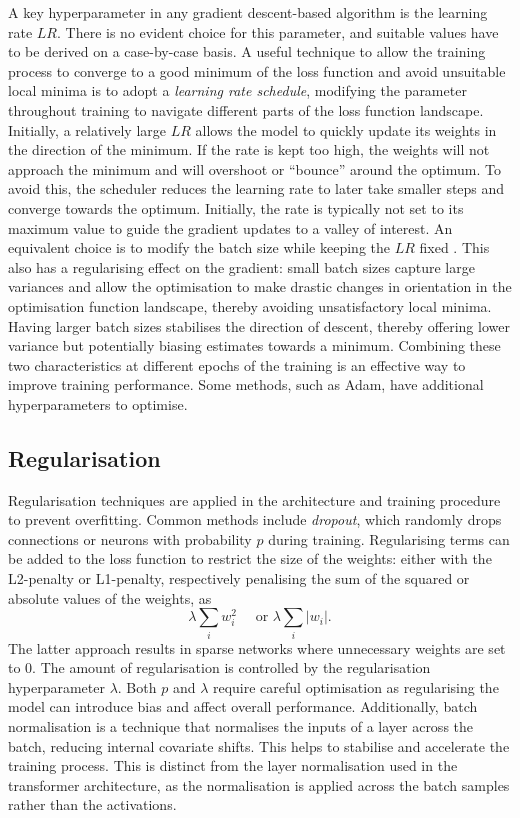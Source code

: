 A key hyperparameter in any gradient descent-based algorithm is the learning rate $LR$. There is no evident choice for this parameter, and suitable values have to be derived on a case-by-case basis. A useful technique to allow the training process to converge to a good minimum of the loss function and avoid unsuitable local minima is to adopt a \textit{learning rate schedule}, modifying the parameter throughout training to navigate different parts of the loss function landscape. Initially, a relatively large $LR$ allows the model to quickly update its weights in the direction of the minimum. If the rate is kept too high, the weights will not approach the minimum and will overshoot or ``bounce'' around the optimum. To avoid this, the scheduler reduces the learning rate to later take smaller steps and converge towards the optimum. Initially, the rate is typically not set to its maximum value to guide the gradient updates to a valley of interest. An equivalent choice is to modify the batch size while keeping the $LR$ fixed \cite{smith2017decay}. This also has a regularising effect on the gradient: small batch sizes capture large variances and allow the optimisation to make drastic changes in orientation in the optimisation function landscape, thereby avoiding unsatisfactory local minima. Having larger batch sizes stabilises the direction of descent, thereby offering lower variance but potentially biasing estimates towards a minimum. Combining these two characteristics at different epochs of the training is an effective way to improve training performance. Some methods, such as Adam, have additional hyperparameters to optimise.

\subsection{Regularisation}
Regularisation techniques are applied in the architecture and training procedure to prevent overfitting. Common methods include \textit{dropout}, which randomly drops connections or neurons with probability $p$ during training. Regularising terms can be added to the loss function to restrict the size of the weights: either with the L2-penalty or L1-penalty, respectively penalising the sum of the squared or absolute values of the weights, as \[\lambda \sum_i w_i^2 \quad \text{ or } \lambda \sum_i |w_i|.\] The latter approach results in sparse networks where unnecessary weights are set to 0. The amount of regularisation is controlled by the regularisation hyperparameter $\lambda$. Both $p$ and $\lambda$ require careful optimisation as regularising the model can introduce bias and affect overall performance. Additionally, batch normalisation is a technique that normalises the inputs of a layer across the batch, reducing internal covariate shifts. This helps to stabilise and accelerate the training process. This is distinct from the layer normalisation used in the transformer architecture, as the normalisation is applied across the batch samples rather than the activations. 

